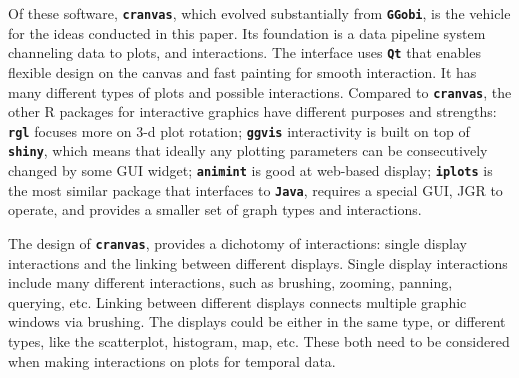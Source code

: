 \documentclass[12pt]{article}
\newcommand{\red}[1]{{\color{red} #1}}
\begin{document}
Of these software, \texttt{\textbf{cranvas}}, which evolved substantially from  \texttt{\textbf{GGobi}}, is the vehicle for the ideas conducted in this paper.
Its foundation is a data pipeline system channeling data to plots, and interactions. The
interface uses \texttt{\textbf{Qt}}\citep{Qt} that enables flexible design
on the canvas and fast painting for smooth interaction. It has
many different types of plots and possible interactions.
Compared to \texttt{\textbf{cranvas}}, the other R packages for
interactive graphics have different purposes and strengths:
\texttt{\textbf{rgl}} focuses more on 3-d plot rotation;
\texttt{\textbf{ggvis}} interactivity is built on top of
\texttt{\textbf{shiny}}\citep{shiny}, which means that ideally any
plotting parameters can be consecutively changed by some GUI widget;
\texttt{\textbf{animint}} is good at web-based display;
\texttt{\textbf{iplots}} is the most similar package that interfaces
to \texttt{\textbf{Java}}, requires a special GUI, JGR to operate, and provides a smaller set of graph types and interactions.

The design of \texttt{\textbf{cranvas}}, \citet{xie2014reactive} provides a dichotomy of interactions: single display interactions and the linking between different displays. Single display interactions include many different interactions, such as brushing, zooming, panning, querying, etc. Linking between different displays connects multiple graphic windows via brushing.  The displays could be either in the same type, or different types, like the scatterplot, histogram, map, etc. These both need to be considered when making interactions on plots for temporal data.


\end{document}
